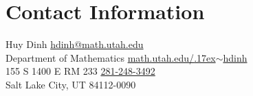 \section{\sc Contact Information}
Huy Dinh      \hfill \href{mailto:hdinh@math.utah.edu}{hdinh@math.utah.edu}\\
Department of Mathematics   \hfill \href{http://www.math.utah.edu/~hdinh/}{math.utah.edu/{\raise.17ex\hbox{$\scriptstyle\sim$}}hdinh}\\
155 S 1400 E RM 233  \hfill \href{tel:281-248-3492}{281-248-3492}\\
Salt Lake City, UT 84112-0090 


